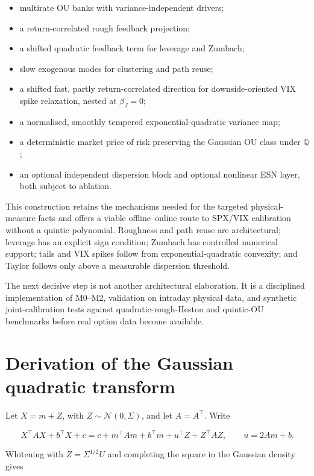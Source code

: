 \documentclass[11pt,a4paper]{article}
\newcommand{\Qq}{\mathbb{Q}}
\begin{document}
\begin{itemize}
  \item multirate OU banks with variance-independent drivers;
  \item a return-correlated rough feedback projection;
  \item a shifted quadratic feedback term for leverage and Zumbach;
  \item slow exogenous modes for clustering and path reuse;
  \item a shifted fast, partly return-correlated direction for downside-oriented VIX spike
  relaxation, nested at \(\beta_J=0\);
  \item a normalised, smoothly tempered exponential-quadratic variance map;
  \item a deterministic market price of risk preserving the Gaussian OU class under \(\Qq\);
  \item an optional independent dispersion block and optional nonlinear ESN layer, both subject
  to ablation.
\end{itemize}

This construction retains the mechanisms needed for the targeted physical-measure facts and
offers a viable offline--online route to SPX/VIX calibration without a quintic polynomial.
Roughness and path reuse are architectural; leverage has an explicit sign condition; Zumbach
has controlled numerical support; tails and VIX spikes follow from exponential-quadratic
convexity; and Taylor follows only above a measurable dispersion threshold.

The next decisive step is not another architectural elaboration. It is a disciplined
implementation of M0--M2, validation on intraday physical data, and synthetic joint-calibration
tests against quadratic-rough-Heston and quintic-OU benchmarks before real option data become
available.

\appendix

\section{Derivation of the Gaussian quadratic transform}

Let \(X=m+Z\), with \(Z\sim\mathcal N(0,\Sigma)\), and let \(A=A^\top\). Write

\begin{equation}
X^\top AX+b^\top X+c
=c+m^\top Am+b^\top m
+u^\top Z+Z^\top AZ,
\qquad u=2Am+b.
\end{equation}

Whitening with \(Z=\Sigma^{1/2}U\) and completing the square in the Gaussian density gives
\end{document}
